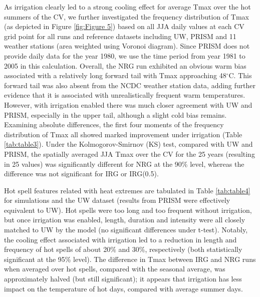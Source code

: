 \documentclass[draft,ms]{agutex}   %
\begin{document}
\begin{article}
As irrigation clearly led to a strong cooling effect for average Tmax over the hot summers of the CV, we further investigated the frequency distribution of Tmax (as depicted in Figure \ref{fig:Figure 5}) based on all JJA daily values at each CV grid point for all runs and reference datasets including UW, PRISM and 11 weather stations (area weighted using Voronoi diagram). Since PRISM does not provide daily data for the year 1980, we use the time period from year 1981 to 2005 in this calculation. Overall, the NRG run exhibited an obvious warm bias associated with a relatively long forward tail with Tmax approaching 48$^\circ$C.  This forward tail was also absent from the NCDC weather station data, adding further evidence that it is associated with unrealistically frequent warm temperatures. However, with irrigation enabled there was much closer agreement with UW and PRISM, especially in the upper tail, although a slight cold bias remains. Examining absolute differences, the first four moments of the frequency distribution of Tmax all showed marked improvement under irrigation (Table \ref{tab:table3}). Under the Kolmogorov-Smirnov (KS) test, compared with UW and PRISM, the spatially averaged JJA Tmax over the CV for the 25 years (resulting in 25 values) was significantly different for NRG at the 90\% level, whereas the difference was not significant for IRG or IRG(0.5).

Hot spell features related with heat extremes are tabulated in Table \ref{tab:table4} for simulations and the UW dataset (results from PRISM were effectively equivalent to UW). Hot spells were too long and too frequent without irrigation, but once irrigation was enabled, length, duration and intensity were all closely matched to UW by the model (no significant differences under t-test). Notably, the cooling effect associated with irrigation led to a reduction in length and frequency of hot spells of about 20$\%$ and 30$\%$, respectively (both statistically significant at the 95\% level). The difference in Tmax between IRG and NRG runs when averaged over hot spells, compared with the seasonal average, was approximately halved (but still significant); it appears that irrigation has less impact on the temperature of hot days, compared with average summer days.



\end{article}
\end{document}
